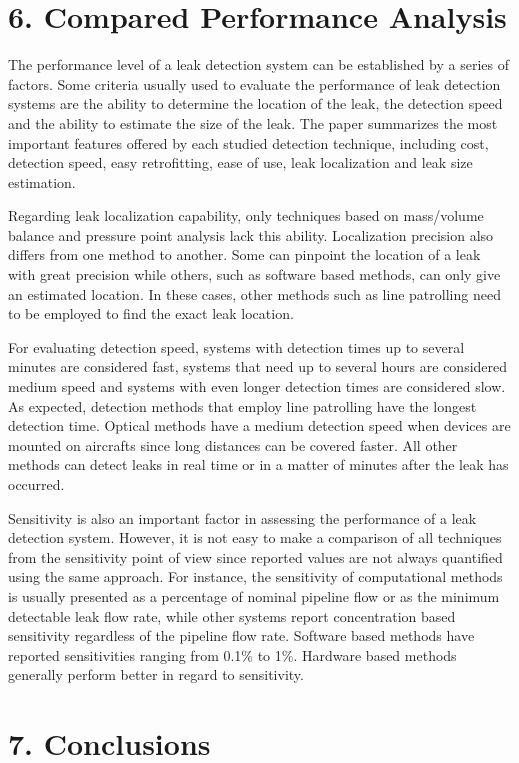 \section*{6. Compared Performance Analysis}

The performance level of a leak detection system can be established by a series of factors. Some criteria usually used to evaluate the performance of leak detection systems are the ability to determine the location of the leak, the detection speed and the ability to estimate the size of the leak. The paper summarizes the most important features offered by each studied detection technique, including cost, detection speed, easy retrofitting, ease of use, leak localization and leak size estimation.

Regarding leak localization capability, only techniques based on mass/volume balance and pressure point analysis lack this ability. Localization precision also differs from one method to another. Some can pinpoint the location of a leak with great precision while others, such as software based methods, can only give an estimated location. In these cases, other methods such as line patrolling need to be employed to find the exact leak location.

For evaluating detection speed, systems with detection times up to several minutes are considered fast, systems that need up to several hours are considered medium speed and systems with even longer detection times are considered slow. As expected, detection methods that employ line patrolling have the longest detection time. Optical methods have a medium detection speed when devices are mounted on aircrafts since long distances can be covered faster. All other methods can detect leaks in real time or in a matter of minutes after the leak has occurred.

Sensitivity is also an important factor in assessing the performance of a leak detection system. However, it is not easy to make a comparison of all techniques from the sensitivity point of view since reported values are not always quantified using the same approach. For instance, the sensitivity of computational methods is usually presented as a percentage of nominal pipeline flow or as the minimum detectable leak flow rate, while other systems report concentration based sensitivity regardless of the pipeline flow rate. Software based methods have reported sensitivities ranging from 0.1\% to 1\%. Hardware based methods generally perform better in regard to sensitivity.

\section*{7. Conclusions}

